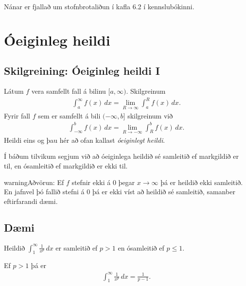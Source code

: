 \documentclass[a4paper,10pt,icelandic]{sphinxmanual}
\begin{document}
Nánar er fjallað um stofnbrotaliðun í kafla 6.2 í kennslubókinni.


\section{Óeiginleg heildi}
\label{kafli06:index-14}\label{kafli06:oeiginleg-heildi}

\subsection{Skilgreining: Óeiginleg heildi I}
\label{kafli06:skilgreining-oeiginleg-heildi-i}
Látum \(f\) vera samfellt fall á bilinu \([a, \infty)\).
Skilgreinum
\begin{equation*}
\begin{split}\int_a^\infty f(x)\,dx=\lim_{R\rightarrow\infty} \int_a^R f(x)\,dx.\end{split}
\end{equation*}
Fyrir fall \(f\) sem er samfellt á bili \((-\infty, b]\)
skilgreinum við
\begin{equation*}
\begin{split}\int_{-\infty}^b f(x)\,dx=\lim_{R\rightarrow-\infty} \int_R^b f(x)\,dx.\end{split}
\end{equation*}
Heildi eins og þau hér að ofan kallast \textit{óeiginlegt heildi}.

Í báðum tilvikum segjum við að óeiginlega heildið sé samleitið ef
markgildið er til, en ósamleitið ef markgildið er ekki til.

\begin{notice}{warning}{Aðvörun:}
Ef \(f\) stefnir ekki á 0 þegar \(x\to \infty\) þá
er heildið ekki samleitið. En jafnvel þó fallið stefni á
0 þá er ekki víst að heildið sé samleitið, samanber
eftirfarandi dæmi.
\end{notice}


\subsection{Dæmi}
\label{kafli06:daemi}
Heildið \(\int_1^\infty \frac{1}{x^p}\,dx\) er samleitið ef
\(p>1\) en ósamleitið ef \(p\leq 1\).

Ef \(p>1\) þá er
\begin{equation*}
\begin{split}\int_1^\infty \frac{1}{x^p}\,dx=\frac{1}{p-1}.\end{split}
\end{equation*}
\end{document}
